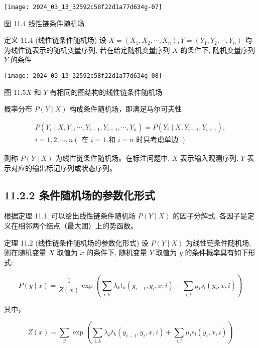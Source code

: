 \documentclass[10pt]{article}
\begin{document}
\begin{CJK*}{UTF8}{bsmi}
\begin{center}
\texttt{[image: 2024\_03\_13\_32592c58f22d1a77d634g-07]}
\end{center}

图 11.4 线性链条件随机场

定义 11.4 (线性链条件随机场) 设 $X=\left(X_{1}, X_{2}, \cdots, X_{n}\right), Y=\left(Y_{1}, Y_{2}, \cdots, Y_{n}\right)$ 均为线性链表示的随机变量序列, 若在给定随机变量序列 $X$ 的条件下, 随机变量序列 $Y$ 的条件

\begin{center}
\texttt{[image: 2024\_03\_13\_32592c58f22d1a77d634g-08]}
\end{center}

图 $11.5 X$ 和 $Y$ 有相同的图结构的线性链条件随机场

概率分布 $P(Y \mid X)$ 构成条件随机场，即满足马尔可夫性


\begin{gather*}
P\left(Y_{i} \mid X, Y_{1}, \cdots, Y_{i-1}, Y_{i+1}, \cdots, Y_{n}\right)=P\left(Y_{i} \mid X, Y_{i-1}, Y_{i+1}\right), \\
i=1,2, \cdots, n(\text { 在 } i=1 \text { 和 } i=n \text { 时只考虑单边 }) \tag{11.9}
\end{gather*}


则称 $P(Y \mid X)$ 为线性链条件随机场。在标注问题中, $X$ 表示输入观测序列, $Y$ 表示对应的输出标记序列或状态序列。

\subsection*{11.2.2 条件随机场的参数化形式}
根据定理 11.1, 可以给出线性链条件随机场 $P(Y \mid X)$ 的因子分解式, 各因子是定义在相邻两个结点（最大团）上的势函数。

定理 11.2 (线性链条件随机场的参数化形式) 设 $P(Y \mid X)$ 为线性链条件随机场, 则在随机变量 $X$ 取值为 $x$ 的条件下, 随机变量 $Y$ 取值为 $y$ 的条件概率具有如下形式:


\begin{equation*}
P(y \mid x)=\frac{1}{Z(x)} \exp \left(\sum_{i, k} \lambda_{k} t_{k}\left(y_{i-1}, y_{i}, x, i\right)+\sum_{i, l} \mu_{l} s_{l}\left(y_{i}, x, i\right)\right) \tag{11.10}
\end{equation*}


其中，


\begin{equation*}
Z(x)=\sum_{y} \exp \left(\sum_{i, k} \lambda_{k} t_{k}\left(y_{i-1}, y_{i}, x, i\right)+\sum_{i, l} \mu_{l} s_{l}\left(y_{i}, x, i\right)\right) \tag{11.11}
\end{equation*}



\end{CJK*}
\end{document}
